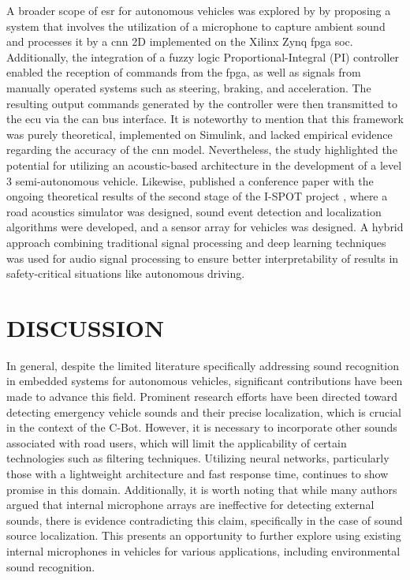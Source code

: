 A broader scope of \gls{esr} for autonomous vehicles was explored by \textcite{Veeraraghavan2020} by proposing a system that involves the utilization of a microphone to capture ambient sound and processes it by a \gls{cnn} 2D implemented on the Xilinx Zynq \gls{fpga} \gls{soc}. Additionally, the integration of a fuzzy logic Proportional-Integral (PI) controller enabled the reception of commands from the \gls{fpga}, as well as signals from manually operated systems such as steering, braking, and acceleration. The resulting output commands generated by the controller were then transmitted to the \gls{ecu} via the \gls{can} bus interface. It is noteworthy to mention that this framework was purely theoretical, implemented on Simulink, and lacked empirical evidence regarding the accuracy of the \gls{cnn} model. Nevertheless, the study highlighted the potential for utilizing an acoustic-based architecture in the development of a level 3 semi-autonomous vehicle. Likewise, \textcite{Yin2023} published a conference paper with the ongoing theoretical results of the second stage of the I-SPOT project \cite{ISPOT2020}, where a road acoustics simulator was designed, sound event detection and localization algorithms were developed, and a sensor array for vehicles was designed. A hybrid approach combining traditional signal processing and deep learning techniques was used for audio signal processing to ensure better interpretability of results in safety-critical situations like autonomous driving.


\section{DISCUSSION}
\label{sec:relt_wrk_discussion}

In general, despite the limited literature specifically addressing sound recognition in embedded systems for autonomous vehicles, significant contributions have been made to advance this field. Prominent research efforts have been directed toward detecting emergency vehicle sounds and their precise localization, which is crucial in the context of the C-Bot. However, it is necessary to incorporate other sounds associated with road users, which will limit the applicability of certain technologies such as filtering techniques. Utilizing neural networks, particularly those with a lightweight architecture and fast response time, continues to show promise in this domain. Additionally, it is worth noting that while many authors argued that internal microphone arrays are ineffective for detecting external sounds, there is evidence contradicting this claim, specifically in the case of sound source localization. This presents an opportunity to further explore using existing internal microphones in vehicles for various applications, including environmental sound recognition.


